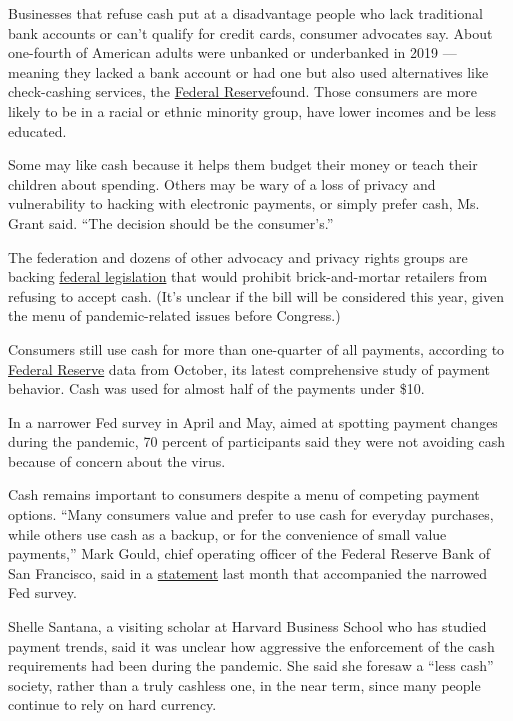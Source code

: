 Businesses that refuse cash put at a disadvantage people who lack
traditional bank accounts or can't qualify for credit cards, consumer
advocates say. About one-fourth of American adults were unbanked or
underbanked in 2019 --- meaning they lacked a bank account or had one
but also used alternatives like check-cashing services, the
\href{https://www.federalreserve.gov/publications/files/2019-report-economic-well-being-us-households-202005.pdf}{Federal
Reserve}found. Those consumers are more likely to be in a racial or
ethnic minority group, have lower incomes and be less educated.

Some may like cash because it helps them budget their money or teach
their children about spending. Others may be wary of a loss of privacy
and vulnerability to hacking with electronic payments, or simply prefer
cash, Ms. Grant said. ``The decision should be the consumer's.''

The federation and dozens of other advocacy and privacy rights groups
are backing
\href{https://consumerfed.org/wp-content/uploads/2020/09/Support_Payment_Choice_Act.pdf}{federal
legislation} that would prohibit brick-and-mortar retailers from
refusing to accept cash. (It's unclear if the bill will be considered
this year, given the menu of pandemic-related issues before Congress.)

Consumers still use cash for more than one-quarter of all payments,
according to \href{https://www.frbsf.org/cash/publications/}{Federal
Reserve} data from October, its latest comprehensive study of payment
behavior. Cash was used for almost half of the payments under \$10.

In a narrower Fed survey in April and May, aimed at spotting payment
changes during the pandemic, 70 percent of participants said they were
not avoiding cash because of concern about the virus.

Cash remains important to consumers despite a menu of competing payment
options. ``Many consumers value and prefer to use cash for everyday
purchases, while others use cash as a backup, or for the convenience of
small value payments,'' Mark Gould, chief operating officer of the
Federal Reserve Bank of San Francisco, said in a
\href{https://www.frbsf.org/our-district/press/news-releases/2020/fed-report-shows-consumers-are-keeping-more-cash-on-hand-during-the-covid-19-pandemic/}{statement}
last month that accompanied the narrowed Fed survey.

Shelle Santana, a visiting scholar at Harvard Business School who has
studied payment trends, said it was unclear how aggressive the
enforcement of the cash requirements had been during the pandemic. She
said she foresaw a ``less cash'' society, rather than a truly cashless
one, in the near term, since many people continue to rely on hard
currency.

